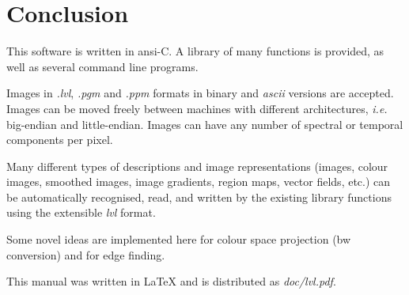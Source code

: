 \documentclass[11pt,twoside,english,a4paper]{article}
\begin{document}
\section{Conclusion}
This software is written in ansi-C.  
A library of many functions is provided, as well as several command line programs.

Images in \textit{.lvl}, \textit{.pgm} and \textit{.ppm} formats in binary and \emph{ascii} versions are accepted.
Images can be moved freely between machines with different architectures, \textit{i.e.}
big-endian and little-endian. Images can have any number of spectral or temporal components per pixel.
  
Many different types of descriptions and image representations (images, colour images,
smoothed images, image gradients, region maps, vector fields, etc.) can be automatically
recognised, read, and written by the existing library functions using the extensible \emph{lvl} format.

Some novel ideas are implemented here for colour space projection (bw conversion)
and for edge finding.

This manual was written in \LaTeX{} and is distributed as \textit{doc/lvl.pdf}.
\end{document}
